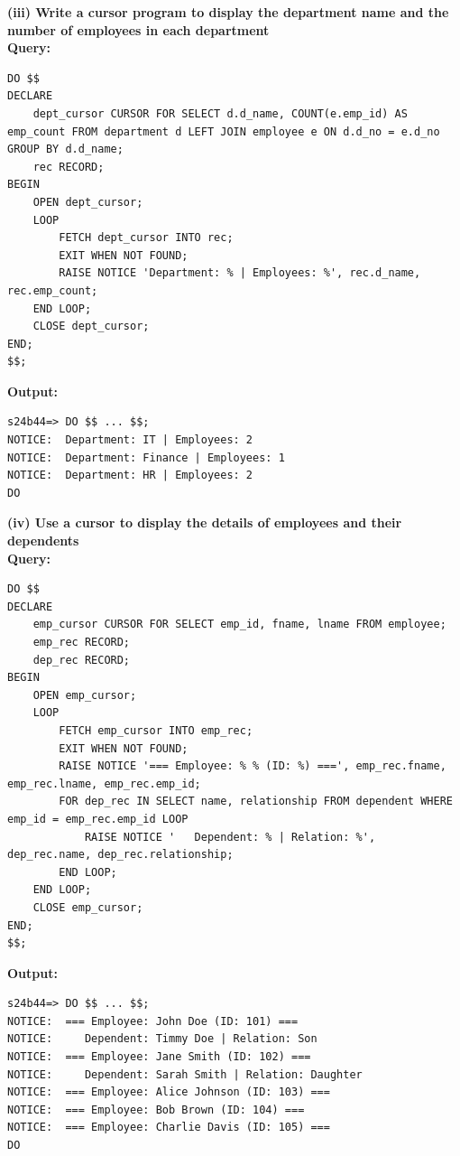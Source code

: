 \documentclass[12pt, a4paper]{article}
\begin{document}
\textbf{(iii) Write a cursor program to display the department name and the number of employees in each department}\\
\textbf{Query:}
\begin{lstlisting}
DO $$
DECLARE
    dept_cursor CURSOR FOR SELECT d.d_name, COUNT(e.emp_id) AS emp_count FROM department d LEFT JOIN employee e ON d.d_no = e.d_no GROUP BY d.d_name;
    rec RECORD;
BEGIN
    OPEN dept_cursor;
    LOOP
        FETCH dept_cursor INTO rec;
        EXIT WHEN NOT FOUND;
        RAISE NOTICE 'Department: % | Employees: %', rec.d_name, rec.emp_count;
    END LOOP;
    CLOSE dept_cursor;
END;
$$;
\end{lstlisting}
\textbf{Output:}
\begin{lstlisting}[style=terminal]
s24b44=> DO $$ ... $$;
NOTICE:  Department: IT | Employees: 2
NOTICE:  Department: Finance | Employees: 1
NOTICE:  Department: HR | Employees: 2
DO
\end{lstlisting}

\textbf{(iv) Use a cursor to display the details of employees and their dependents}\\
\textbf{Query:}
\begin{lstlisting}
DO $$
DECLARE
    emp_cursor CURSOR FOR SELECT emp_id, fname, lname FROM employee;
    emp_rec RECORD;
    dep_rec RECORD;
BEGIN
    OPEN emp_cursor;
    LOOP
        FETCH emp_cursor INTO emp_rec;
        EXIT WHEN NOT FOUND;
        RAISE NOTICE '=== Employee: % % (ID: %) ===', emp_rec.fname, emp_rec.lname, emp_rec.emp_id;
        FOR dep_rec IN SELECT name, relationship FROM dependent WHERE emp_id = emp_rec.emp_id LOOP
            RAISE NOTICE '   Dependent: % | Relation: %', dep_rec.name, dep_rec.relationship;
        END LOOP;
    END LOOP;
    CLOSE emp_cursor;
END;
$$;
\end{lstlisting}
\textbf{Output:}
\begin{lstlisting}[style=terminal]
s24b44=> DO $$ ... $$;
NOTICE:  === Employee: John Doe (ID: 101) ===
NOTICE:     Dependent: Timmy Doe | Relation: Son
NOTICE:  === Employee: Jane Smith (ID: 102) ===
NOTICE:     Dependent: Sarah Smith | Relation: Daughter
NOTICE:  === Employee: Alice Johnson (ID: 103) ===
NOTICE:  === Employee: Bob Brown (ID: 104) ===
NOTICE:  === Employee: Charlie Davis (ID: 105) ===
DO
\end{lstlisting}
\end{document}
